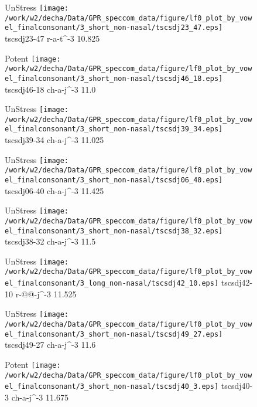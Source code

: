 \documentclass{article}
\begin{document}
\begin{figure}[t]
\begin{minipage}[b]{.24\textwidth}
UnStress
\centering
\texttt{[image: /work/w2/decha/Data/GPR\_speccom\_data/figure/lf0\_plot\_by\_vowel\_finalconsonant/3\_short\_non-nasal/tscsdj23\_47.eps]}
tscsdj23-47 r-a-t\textasciicircum-3 10.825
\end{minipage}
\begin{minipage}[b]{.24\textwidth}
\colorbox{Apricot}{Potent}
\centering
\texttt{[image: /work/w2/decha/Data/GPR\_speccom\_data/figure/lf0\_plot\_by\_vowel\_finalconsonant/3\_short\_non-nasal/tscsdj46\_18.eps]}
tscsdj46-18 ch-a-j\textasciicircum-3 11.0
\end{minipage}
\begin{minipage}[b]{.24\textwidth}
UnStress
\centering
\texttt{[image: /work/w2/decha/Data/GPR\_speccom\_data/figure/lf0\_plot\_by\_vowel\_finalconsonant/3\_short\_non-nasal/tscsdj39\_34.eps]}
tscsdj39-34 ch-a-j\textasciicircum-3 11.025
\end{minipage}
\begin{minipage}[b]{.24\textwidth}
UnStress
\centering
\texttt{[image: /work/w2/decha/Data/GPR\_speccom\_data/figure/lf0\_plot\_by\_vowel\_finalconsonant/3\_short\_non-nasal/tscsdj06\_40.eps]}
tscsdj06-40 ch-a-j\textasciicircum-3 11.425
\end{minipage}
\end{figure}

\begin{figure}[t]
\begin{minipage}[b]{.24\textwidth}
UnStress
\centering
\texttt{[image: /work/w2/decha/Data/GPR\_speccom\_data/figure/lf0\_plot\_by\_vowel\_finalconsonant/3\_short\_non-nasal/tscsdj38\_32.eps]}
tscsdj38-32 ch-a-j\textasciicircum-3 11.5
\end{minipage}
\begin{minipage}[b]{.24\textwidth}
UnStress
\centering
\texttt{[image: /work/w2/decha/Data/GPR\_speccom\_data/figure/lf0\_plot\_by\_vowel\_finalconsonant/3\_long\_non-nasal/tscsdj42\_10.eps]}
tscsdj42-10 r-@@-j\textasciicircum-3 11.525
\end{minipage}
\begin{minipage}[b]{.24\textwidth}
UnStress
\centering
\texttt{[image: /work/w2/decha/Data/GPR\_speccom\_data/figure/lf0\_plot\_by\_vowel\_finalconsonant/3\_short\_non-nasal/tscsdj49\_27.eps]}
tscsdj49-27 ch-a-j\textasciicircum-3 11.6
\end{minipage}
\begin{minipage}[b]{.24\textwidth}
\colorbox{Apricot}{Potent}
\centering
\texttt{[image: /work/w2/decha/Data/GPR\_speccom\_data/figure/lf0\_plot\_by\_vowel\_finalconsonant/3\_short\_non-nasal/tscsdj40\_3.eps]}
tscsdj40-3 ch-a-j\textasciicircum-3 11.675
\end{minipage}
\end{figure}
\end{document}
